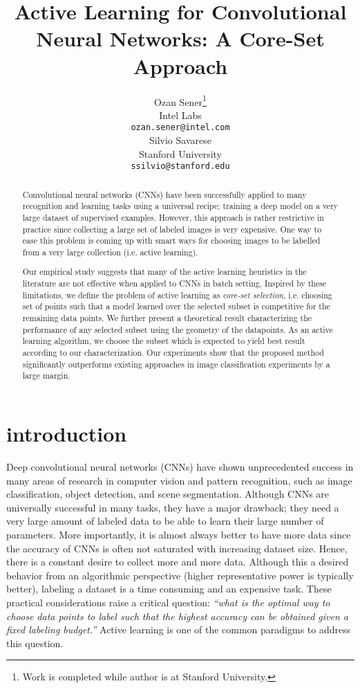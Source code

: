 \documentclass{article} \usepackage{iclr2018_conference,times}
\title{Active Learning for Convolutional Neural Networks: A Core-Set Approach}
\author{Ozan Sener\thanks{ Work is completed while author is at Stanford University.} \\
Intel Labs \\
\texttt{ozan.sener@intel.com} \\
\And
Silvio Savarese\\
Stanford University \\
\texttt{ssilvio@stanford.edu} 
}
\makeatletter
\newcommand*{\ie}{i.e.\@\xspace}
\makeatother
\begin{document}
\maketitle

\begin{abstract} 
Convolutional neural networks (CNNs) have been successfully applied to many recognition and learning tasks using a universal recipe;
    training a deep model on a very large dataset of supervised examples. However, this approach is rather restrictive in practice since collecting a
    large set of labeled images is very expensive. One way to ease this problem is coming up with smart ways for choosing images to be labelled from a
    very large collection (\ie active learning).

    Our empirical study suggests that many of the active learning heuristics in the literature are not effective when applied to CNNs in batch setting. Inspired by these limitations, we define the problem of active learning as \emph{core-set selection}, \ie choosing set of points such that a model learned over the selected subset is competitive for the remaining data points. We further present a theoretical result characterizing the performance of any selected subset using the geometry of the datapoints. As an active learning algorithm, we choose the subset which is expected to yield best result according to our characterization. Our experiments show that the proposed method significantly outperforms existing approaches in image classification experiments by a large margin. 
\end{abstract} 

\section{introduction}
Deep convolutional neural networks (CNNs) have shown unprecedented success in many areas of research in computer vision and pattern recognition, such as
image classification, object detection, and scene segmentation. Although CNNs are universally successful in many tasks, they have a major drawback;
they need a very large amount of labeled data to be able to learn their large number of parameters. More importantly, it is almost always better to have
more data since the accuracy of CNNs is often not saturated with increasing dataset size. Hence, there is a constant desire to collect more and more
data. Although this a desired behavior from an algorithmic perspective (higher representative power is typically better), labeling a dataset is
a time consuming and an expensive task. These practical considerations raise a critical question: \emph{``what is the optimal way to choose data
points to label such that the highest accuracy can be obtained given a fixed labeling budget.''} Active learning is one of the common paradigms to
address this question.
\end{document}
